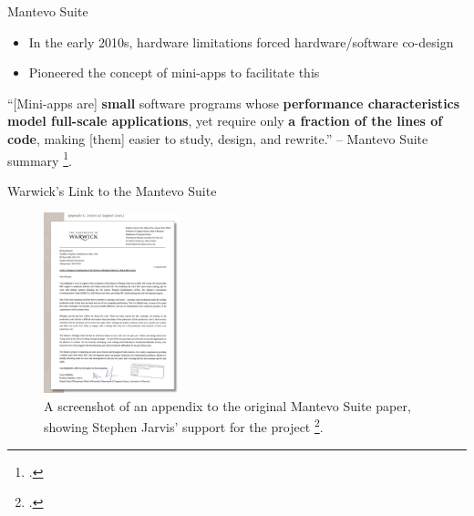 \documentclass[10pt,aspectratio=169]{beamer}
\begin{document}
\begin{frame}{Mantevo Suite}
    \begin{itemize}
        \item In the early 2010s, hardware limitations forced hardware/software co-design
        \item Pioneered the concept of mini-apps to facilitate this
    \end{itemize}
    \vspace*{0.75cm}
    \begin{displayquote}
        \vspace{0.2cm}
        ``[Mini-apps are] \textbf{small} software programs whose \textbf{performance characteristics model full-scale applications}, yet require only \textbf{a fraction of the lines of code}, making [them] easier to study, design, and rewrite.'' -- Mantevo Suite summary \footcite{heroux2013mantevo}.
    \end{displayquote}
\end{frame}

\begin{frame}{Warwick's Link to the Mantevo Suite}
    \begin{figure}[H]
        \includegraphics[width=0.35\textwidth]{images/warwick_mantevo_link.png}
        \caption{A screenshot of an appendix to the original Mantevo Suite paper, showing Stephen Jarvis' support for the project \footcite{heroux2013mantevo}.}
        \label{fig:warwick_mantevo_link}
    \end{figure}
\end{frame}
\end{document}
